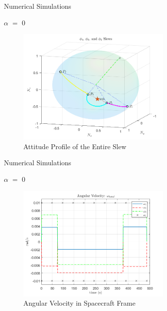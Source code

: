 \documentclass{beamer}
\begin{document}
\begin{frame}{Numerical Simulations}
\begin{block}{$\alpha$ $=$ 0}
	
	\begin{figure}[H]
		\label{fig:phi1_phi2_phi3_alpha0}
		\includegraphics[width=3in]{figures/alpha0/phi1_phi2_phi3.png}
		\caption{Attitude Profile of the Entire Slew}
	\end{figure}
	
\end{block}
\end{frame}
\begin{frame}{Numerical Simulations}
	\begin{block}{$\alpha$ $=$ 0}
		
		
		\begin{figure}[H]
			\label{fig:ang_vel_phi_total_alpha0}
			\begin{center}
				\includegraphics[width=3in]{figures/alpha0/ang_vel.png}
			\end{center}
			\caption{Angular Velocity in Spacecraft Frame}
		\end{figure}
		
	\end{block}
\end{frame}
\end{document}
